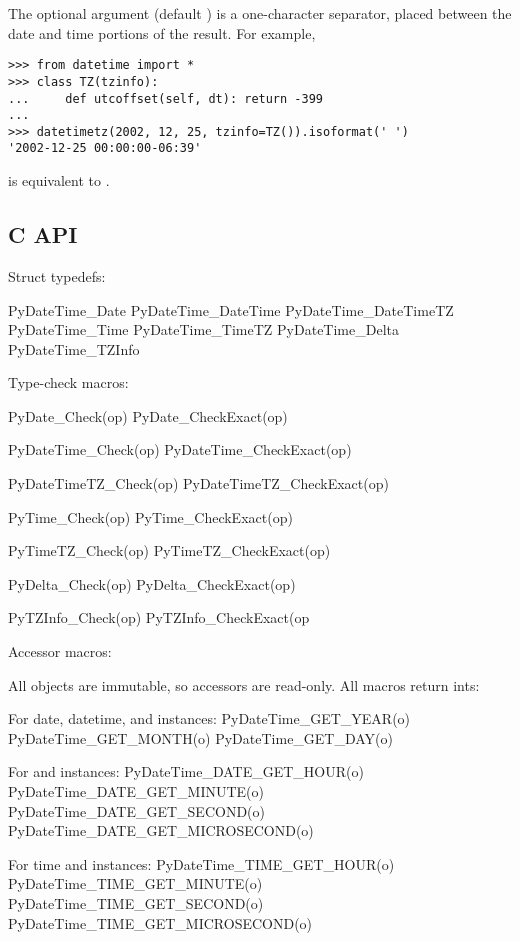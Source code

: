     The optional argument  (default ) is a
    one-character separator, placed between the date and time portions
    of the result.  For example,

\begin{verbatim}
>>> from datetime import *
>>> class TZ(tzinfo):
...     def utcoffset(self, dt): return -399
...
>>> datetimetz(2002, 12, 25, tzinfo=TZ()).isoformat(' ')
'2002-12-25 00:00:00-06:39'
\end{verbatim}

 is equivalent to .


\subsection{C API}

Struct typedefs:

    PyDateTime_Date
    PyDateTime_DateTime
    PyDateTime_DateTimeTZ
    PyDateTime_Time
    PyDateTime_TimeTZ
    PyDateTime_Delta
    PyDateTime_TZInfo

Type-check macros:

    PyDate_Check(op)
    PyDate_CheckExact(op)

    PyDateTime_Check(op)
    PyDateTime_CheckExact(op)

    PyDateTimeTZ_Check(op)
    PyDateTimeTZ_CheckExact(op)

    PyTime_Check(op)
    PyTime_CheckExact(op)

    PyTimeTZ_Check(op)
    PyTimeTZ_CheckExact(op)

    PyDelta_Check(op)
    PyDelta_CheckExact(op)

    PyTZInfo_Check(op)
    PyTZInfo_CheckExact(op

Accessor macros:

All objects are immutable, so accessors are read-only.  All macros
return ints:

    For date, datetime, and  instances:
        PyDateTime_GET_YEAR(o)
        PyDateTime_GET_MONTH(o)
        PyDateTime_GET_DAY(o)

    For  and  instances:
        PyDateTime_DATE_GET_HOUR(o)
        PyDateTime_DATE_GET_MINUTE(o)
        PyDateTime_DATE_GET_SECOND(o)
        PyDateTime_DATE_GET_MICROSECOND(o)

    For time and  instances:
        PyDateTime_TIME_GET_HOUR(o)
        PyDateTime_TIME_GET_MINUTE(o)
        PyDateTime_TIME_GET_SECOND(o)
        PyDateTime_TIME_GET_MICROSECOND(o)
